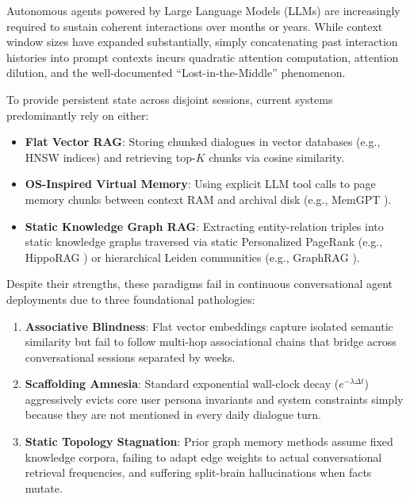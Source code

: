 \documentclass[conference]{IEEEtran}
\begin{document}
Autonomous agents powered by Large Language Models (LLMs) are increasingly required to sustain coherent interactions over months or years. While context window sizes have expanded substantially, simply concatenating past interaction histories into prompt contexts incurs quadratic attention computation, attention dilution, and the well-documented ``Lost-in-the-Middle'' phenomenon.

To provide persistent state across disjoint sessions, current systems predominantly rely on either:
\begin{itemize}
    \item \textbf{Flat Vector RAG}: Storing chunked dialogues in vector databases (e.g., HNSW indices) and retrieving top-$K$ chunks via cosine similarity.
    \item \textbf{OS-Inspired Virtual Memory}: Using explicit LLM tool calls to page memory chunks between context RAM and archival disk (e.g., MemGPT \cite{packer2023memgpt}).
    \item \textbf{Static Knowledge Graph RAG}: Extracting entity-relation triples into static knowledge graphs traversed via static Personalized PageRank (e.g., HippoRAG \cite{gutierrez2024hipporag}) or hierarchical Leiden communities (e.g., GraphRAG \cite{edge2024graphrag}).
\end{itemize}

Despite their strengths, these paradigms fail in continuous conversational agent deployments due to three foundational pathologies:
\begin{enumerate}
    \item \textbf{Associative Blindness}: Flat vector embeddings capture isolated semantic similarity but fail to follow multi-hop associational chains that bridge across conversational sessions separated by weeks.
    \item \textbf{Scaffolding Amnesia}: Standard exponential wall-clock decay ($e^{-\lambda \Delta t}$) aggressively evicts core user persona invariants and system constraints simply because they are not mentioned in every daily dialogue turn.
    \item \textbf{Static Topology Stagnation}: Prior graph memory methods assume fixed knowledge corpora, failing to adapt edge weights to actual conversational retrieval frequencies, and suffering split-brain hallucinations when facts mutate.
\end{enumerate}
\end{document}
